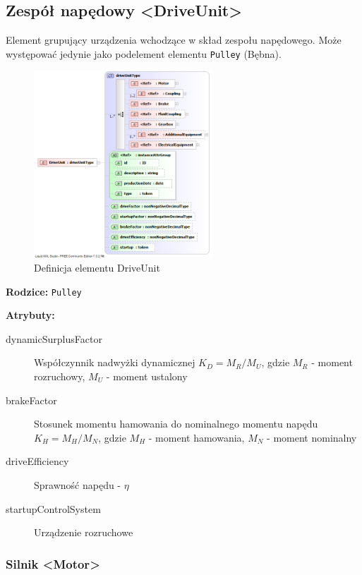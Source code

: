 \documentclass[12pt,a4paper]{article}
\begin{document}
\subsection{Zespół napędowy <DriveUnit>}
Element grupujący urządzenia wchodzące w skład zespołu napędowego. Może
występować jedynie jako podelement elementu {\tt Pulley} (Bębna).

\begin{figure}[H]
  \centering
  \includegraphics[width=0.6\textwidth]{png/liquid/DriveUnit}
  \caption{Definicja elementu DriveUnit}
  \label{fig:driveUnit-xsd}
\end{figure}

\noindent\textbf{Rodzice:} \texttt{Pulley}

\noindent\textbf{Atrybuty:}
\begin{description}
\item[dynamicSurplusFactor] Współczynnik nadwyżki dynamicznej $K_D = M_R/M_U$,
  gdzie $M_R$ - moment rozruchowy, $M_U$ - moment ustalony
\item[brakeFactor] Stosunek momentu hamowania do nominalnego momentu napędu $K_H
  = M_H/M_N$, gdzie $M_H$ - moment hamowania, $M_N$ - moment nominalny
\item[driveEfficiency] Sprawność napędu - $\eta$
\item[startupControlSystem] Urządzenie rozruchowe
\end{description}

\subsubsection{Silnik <Motor>}
\end{document}
